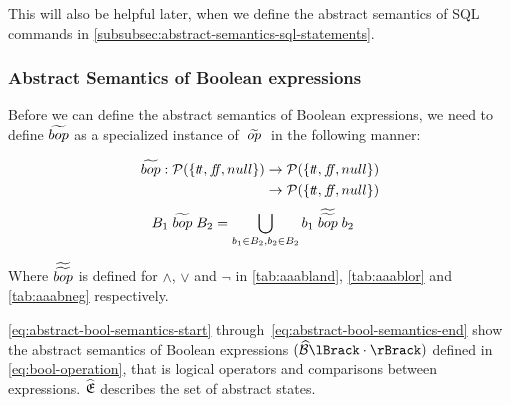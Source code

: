 This will also be helpful later, when we define the abstract semantics of SQL commands in \autoref{subsubsec:abstract-semantics-sql-statements}.

\subsubsection{Abstract Semantics of Boolean expressions}
Before we can define the abstract semantics of Boolean expressions, we need to define $\widetilde{bop}$ as a specialized instance of $\;\widetilde{op}\;$ in the following manner:


\begin{align}
    \begin{split}
        \aab{bop} : \mathcal{P}(\{\true, \false, null\}) &\rightarrow \mathcal{P}(\{\true, \false, null\}) \\
        &\rightarrow \mathcal{P}(\{\true, \false, null\})
    \end{split}
\end{align}
\begin{align}
    B_1 \;\widetilde{bop}\; B_2 &= \bigcup_{b_1 \in B_2, b_2 \in B_2} b_1 \;\widetilde{\widetilde{bop}}\; b_2
\end{align}

Where $\widetilde{\widetilde{bop}}$ is defined for $\land$, $\lor$ and $\neg$ in \autoref{tab:aaabland}, \autoref{tab:aaablor} and \autoref{tab:aaabneg} respectively.

\autoref{eq:abstract-bool-semantics-start} through~\ref{eq:abstract-bool-semantics-end} show the abstract semantics of Boolean expressions $(\absboolsem{\cdot})$ defined in \autoref{eq:bool-operation}, that is logical operators and comparisons between expressions.
$\widehat{\mathfrak{E}}$ describes the set of abstract states.


